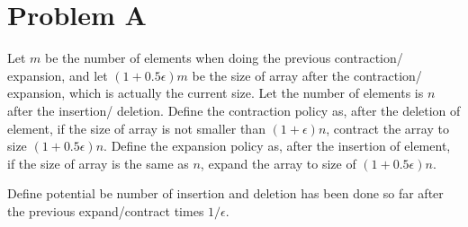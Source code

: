 \documentclass[12pt]{article}
\begin{document}
\section*{Problem A}

Let $m$ be the number of elements when doing the previous contraction/ expansion,
and let $(1+0.5\epsilon)m$ be the size of array after the contraction/ expansion,
which is actually the current size.
Let the number of elements is $n$ after the insertion/ deletion.
Define the contraction policy as, after the deletion of element,
if the size of array is not smaller than $(1+\epsilon)n$,
contract the array to size $(1+0.5\epsilon)n$.
Define the expansion policy as, after the insertion of element,
if the size of array is the same as $n$,
expand the array to size of $(1+0.5\epsilon)n$.

Define potential be number of insertion and deletion has been done so far after the previous expand/contract times $1/\epsilon$.
\end{document}
